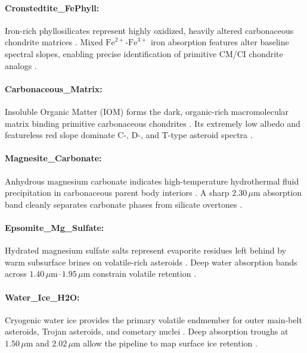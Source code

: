 \documentclass[11pt,a4paper]{article}
\begin{document}
\paragraph{Cronstedtite\_FePhyll:} Iron-rich phyllosilicates represent highly oxidized, heavily altered carbonaceous chondrite matrices \cite{Alexander2007, Macke2011}. Mixed $\text{Fe}^{2+}\text{-}\text{Fe}^{3+}$ iron absorption features alter baseline spectral slopes, enabling precise identification of primitive CM/CI chondrite analogs \cite{Vilas1989, Alexander2007}.

\paragraph{Carbonaceous\_Matrix:} Insoluble Organic Matter (IOM) forms the dark, organic-rich macromolecular matrix binding primitive carbonaceous chondrites \cite{Alexander2007}. Its extremely low albedo and featureless red slope dominate C-, D-, and T-type asteroid spectra \cite{DeMeo2009, Alexander2007}.

\paragraph{Magnesite\_Carbonate:} Anhydrous magnesium carbonate indicates high-temperature hydrothermal fluid precipitation in carbonaceous parent body interiors \cite{Althoff1977}. A sharp $2.30\,\mu\text{m}$ absorption band cleanly separates carbonate phases from silicate overtones \cite{Althoff1977}.

\paragraph{Epsomite\_Mg\_Sulfate:} Hydrated magnesium sulfate salts represent evaporite residues left behind by warm subsurface brines on volatile-rich asteroids \cite{Baur1964}. Deep water absorption bands across $1.40\,\mu\text{m}$--$1.95\,\mu\text{m}$ constrain volatile retention \cite{Rivkin2002}.

\paragraph{Water\_Ice\_H2O:} Cryogenic water ice provides the primary volatile endmember for outer main-belt asteroids, Trojan asteroids, and cometary nuclei \cite{Clark1990}. Deep absorption troughs at $1.50\,\mu\text{m}$ and $2.02\,\mu\text{m}$ allow the pipeline to map surface ice retention \cite{Clark1990, Campins2010}.
\end{document}
